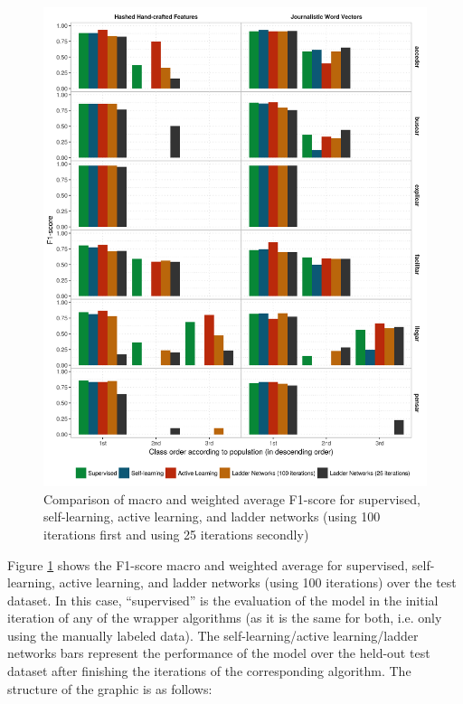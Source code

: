 \begin{figure}[hb!]
  \centering
  \includegraphics[height=0.9\textheight,width=\textwidth,keepaspectratio]
    {plots/ladder/per_sense_fscore}
  \caption{Comparison of macro and weighted average F1-score for supervised,
  self-learning, active learning, and ladder networks (using 100 iterations
  first and using 25 iterations secondly)}
  \label{fig:ladder:performance}
\end{figure}

Figure \ref{fig:ladder:performance} shows the F1-score macro and weighted
average for supervised, self-learning, active learning, and ladder networks
(using 100 iterations) over the test dataset. In this case, ``supervised'' is
the evaluation of the model in the initial iteration of any of the wrapper
algorithms (as it is the same for both, i.e. only using the manually labeled
data). The self-learning/active learning/ladder networks bars represent the
performance of the model over the held-out test dataset after finishing the
iterations of the corresponding algorithm. The structure of the graphic is as
follows:

